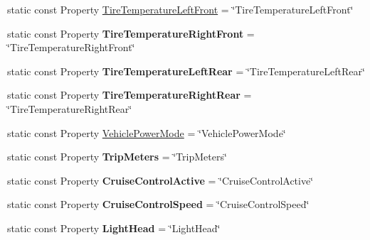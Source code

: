 \begin{DoxyCompactItemize}
\item 
static const Property \hyperlink{classVehicleProperty_aed78bc0c777f0850dee1ee878c8d613a}{Tire\-Temperature\-Left\-Front} = \char`\"{}Tire\-Temperature\-Left\-Front\char`\"{}
\item 
\hypertarget{classVehicleProperty_ac5c976a11640f09fa709f13830f69c75}{static const Property {\bfseries Tire\-Temperature\-Right\-Front} = \char`\"{}Tire\-Temperature\-Right\-Front\char`\"{}}\label{classVehicleProperty_ac5c976a11640f09fa709f13830f69c75}

\item 
\hypertarget{classVehicleProperty_abf066893a9d17c252b222d617497578d}{static const Property {\bfseries Tire\-Temperature\-Left\-Rear} = \char`\"{}Tire\-Temperature\-Left\-Rear\char`\"{}}\label{classVehicleProperty_abf066893a9d17c252b222d617497578d}

\item 
\hypertarget{classVehicleProperty_aaf68ca684bd75f1e2d8ac78881701318}{static const Property {\bfseries Tire\-Temperature\-Right\-Rear} = \char`\"{}Tire\-Temperature\-Right\-Rear\char`\"{}}\label{classVehicleProperty_aaf68ca684bd75f1e2d8ac78881701318}

\item 
static const Property \hyperlink{classVehicleProperty_a80cc1f343da6754346e4bcc0cc7ae009}{Vehicle\-Power\-Mode} = \char`\"{}Vehicle\-Power\-Mode\char`\"{}
\item 
\hypertarget{classVehicleProperty_a893b05cb0e292082070458efa6066e91}{static const Property {\bfseries Trip\-Meters} = \char`\"{}Trip\-Meters\char`\"{}}\label{classVehicleProperty_a893b05cb0e292082070458efa6066e91}

\item 
\hypertarget{classVehicleProperty_a3203c1cb22ff3b530a887228096863e5}{static const Property {\bfseries Cruise\-Control\-Active} = \char`\"{}Cruise\-Control\-Active\char`\"{}}\label{classVehicleProperty_a3203c1cb22ff3b530a887228096863e5}

\item 
\hypertarget{classVehicleProperty_a50c00b5a2d7cfd500a1cd7473124c737}{static const Property {\bfseries Cruise\-Control\-Speed} = \char`\"{}Cruise\-Control\-Speed\char`\"{}}\label{classVehicleProperty_a50c00b5a2d7cfd500a1cd7473124c737}

\item 
\hypertarget{classVehicleProperty_ae98356a8b49f28837a94b13094156e90}{static const Property {\bfseries Light\-Head} = \char`\"{}Light\-Head\char`\"{}}\label{classVehicleProperty_ae98356a8b49f28837a94b13094156e90}


\end{DoxyCompactItemize}
